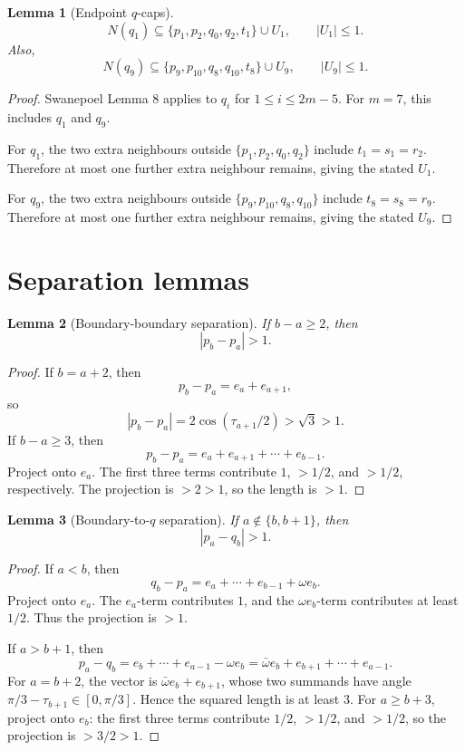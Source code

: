 \documentclass[11pt]{article}
\theoremstyle{plain}
\newtheorem{lemma}{Lemma}
\numberwithin{equation}{section}
\begin{document}
\begin{lemma}[Endpoint $q$-caps]\label{lem:q-caps}
\[
 N(q_1)\subseteq \{p_1,p_2,q_0,q_2,t_1\}\cup U_1,
 \qquad |U_1|\le1.
\]
Also,
\[
 N(q_9)\subseteq \{p_9,p_{10},q_8,q_{10},t_8\}\cup U_9,
 \qquad |U_9|\le1.
\]
\end{lemma}

\begin{proof}
Swanepoel Lemma 8 applies to $q_i$ for $1\le i\le 2m-5$. For $m=7$, this includes $q_1$ and $q_9$.

For $q_1$, the two extra neighbours outside $\{p_1,p_2,q_0,q_2\}$ include $t_1=s_1=r_2$. Therefore at most one further extra neighbour remains, giving the stated $U_1$.

For $q_9$, the two extra neighbours outside $\{p_9,p_{10},q_8,q_{10}\}$ include $t_8=s_8=r_9$. Therefore at most one further extra neighbour remains, giving the stated $U_9$.
\end{proof}

\section{Separation lemmas}

\begin{lemma}[Boundary-boundary separation]\label{lem:bb}
If $b-a\ge2$, then
\[
 |p_b-p_a|>1.
\]
\end{lemma}

\begin{proof}
If $b=a+2$, then
\[
 p_b-p_a=e_a+e_{a+1},
\]
so
\[
 |p_b-p_a|=2\cos(\tau_{a+1}/2)>\sqrt3>1.
\]
If $b-a\ge3$, then
\[
 p_b-p_a=e_a+e_{a+1}+\cdots+e_{b-1}.
\]
Project onto $e_a$. The first three terms contribute $1$, $>1/2$, and $>1/2$, respectively. The projection is $>2>1$, so the length is $>1$.
\end{proof}

\begin{lemma}[Boundary-to-$q$ separation]\label{lem:bq}
If $a\notin\{b,b+1\}$, then
\[
 |p_a-q_b|>1.
\]
\end{lemma}

\begin{proof}
If $a<b$, then
\[
 q_b-p_a=e_a+\cdots+e_{b-1}+\omega e_b.
\]
Project onto $e_a$. The $e_a$-term contributes $1$, and the $\omega e_b$-term contributes at least $1/2$. Thus the projection is $>1$.

If $a>b+1$, then
\[
 p_a-q_b=e_b+\cdots+e_{a-1}-\omega e_b
       =\bar\omega e_b+e_{b+1}+\cdots+e_{a-1}.
\]
For $a=b+2$, the vector is $\bar\omega e_b+e_{b+1}$, whose two summands have angle $\pi/3-\tau_{b+1}\in[0,\pi/3]$. Hence the squared length is at least $3$. For $a\ge b+3$, project onto $e_b$: the first three terms contribute $1/2$, $>1/2$, and $>1/2$, so the projection is $>3/2>1$.
\end{proof}
\end{document}

